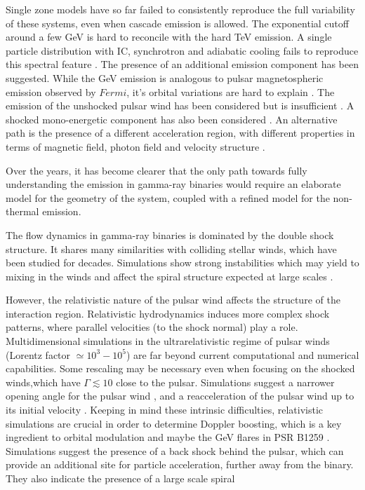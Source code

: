  Single zone models have so far failed to consistently reproduce the full variability of these systems, even when cascade emission is allowed. The exponential cutoff around a few GeV is hard to reconcile with the hard TeV emission. A single particle distribution with IC, synchrotron  and adiabatic  cooling fails to reproduce  this spectral feature \citep{2008MNRAS.383..467K,2013A&A...551A..17Z}.   The presence of an additional emission component has been suggested. While the GeV emission  is analogous to  pulsar magnetospheric emission observed by $Fermi$, it's orbital variations are hard to explain \citep{2012ApJ...749...54H}.   The emission of the unshocked pulsar wind \citep{2007MNRAS.380..320K}   has been considered but is insufficient \citep{2008APh....30..239S}.  A shocked mono-energetic  component has also been considered \citep{2013A&A...557A.127D}.  An alternative path is the presence of a different acceleration region, with different properties in terms of magnetic field, photon field and velocity structure \citep{2013A&A...551A..17Z}.

Over the years, it has become clearer that the only path towards fully understanding the emission in gamma-ray binaries would require an elaborate model for the geometry of the system, coupled with a refined model for the non-thermal emission. 

The flow dynamics in gamma-ray binaries is dominated by the double shock structure. It  shares many similarities with colliding stellar winds, which have been studied for decades. Simulations \citep{2009MNRAS.396.1743P,2011MNRAS.418.2618L} show strong instabilities which may yield to mixing in the winds \citep{2010MNRAS.403.1873Z} and affect the spiral structure expected at large scales \citep{2012A&A...546A..60L,2012A&A...544A..59B}.  

However, the relativistic nature of the pulsar wind affects the structure of the interaction region. Relativistic hydrodynamics induces more complex shock patterns, where parallel velocities (to the shock normal) play a role. Multidimensional simulations in the  ultrarelativistic regime of pulsar winds (Lorentz factor $\simeq 10^3-10^5$) are far beyond current computational and numerical capabilities. Some rescaling may be necessary even when focusing on the shocked winds,which have $\Gamma\lesssim 10$ close to the pulsar.  Simulations suggest a narrower opening angle for the pulsar wind \citep{2013A&A...560A..79L}, and a reacceleration of the pulsar wind up to its initial velocity \citep{2008MNRAS.387...63B}. Keeping in mind these intrinsic difficulties, relativistic simulations are crucial in order to determine Doppler boosting, which is a key ingredient to orbital modulation and maybe the GeV flares in PSR B1259 \citep{2012ApJ...753..127K}. Simulations suggest the presence of a back shock behind the pulsar, which can provide an additional site for particle acceleration, further away from the binary. They also indicate the presence of a large scale spiral \citep{2012A&A...544A..59B,2016MNRAS.456L..64B}


